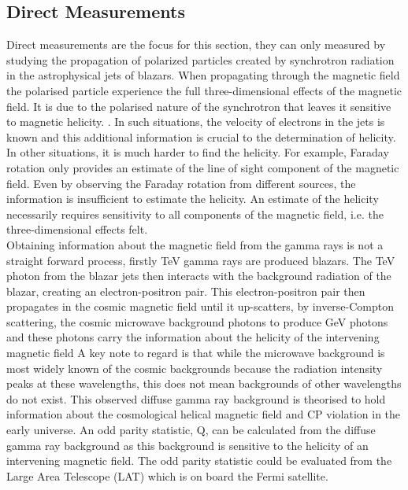 \subsection {Direct Measurements}
Direct measurements are the focus for this section, they can only measured by studying the propagation of polarized particles created by synchrotron radiation in the astrophysical jets of blazars. When propagating through the magnetic field the polarised particle experience the full three-dimensional effects of the magnetic field. It is due to the polarised nature of the synchrotron that leaves it sensitive to magnetic helicity. \cite{2} \cite{9}.
In such situations, the velocity of electrons in the jets is known and this additional information is crucial to the determination of helicity. In other situations, it is much harder to find the helicity. For example, Faraday rotation only provides an estimate of the line of sight component of the magnetic field. Even by observing the Faraday rotation from different sources, the information is insufficient to estimate the helicity. An estimate of the helicity necessarily requires sensitivity to all components of the magnetic field, i.e. the three-dimensional effects felt. \cite{15} \\
Obtaining information about the magnetic field from the gamma rays is not a straight forward process, firstly TeV gamma rays are produced blazars. The TeV photon from the blazar jets then interacts with the background radiation of the blazar, creating an electron-positron pair. This electron-positron pair then propagates in the cosmic magnetic field until it up-scatters, by inverse-Compton scattering, the cosmic microwave background photons to produce GeV photons and these photons carry the information about the helicity of the intervening magnetic field \cite{9} A key note to regard is that while the microwave background is most widely known of the cosmic backgrounds because the radiation intensity peaks at these wavelengths, this does not mean backgrounds of other wavelengths do not exist. This observed diffuse gamma ray background is theorised to hold information about the cosmological helical magnetic field and CP violation in the early universe. \cite{10} An odd parity statistic, Q, can be calculated from the diffuse gamma ray background as this background is sensitive to the helicity of an intervening magnetic field. The odd parity statistic could be evaluated from the Large Area Telescope (LAT) which is on board the Fermi satellite.\cite{2} 

